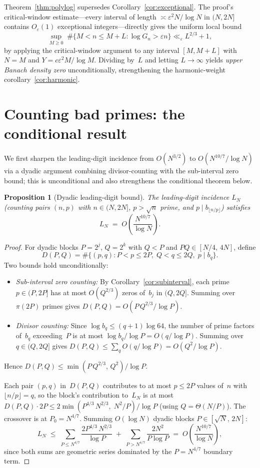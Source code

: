\documentclass[11pt]{article}
\newtheorem{proposition}[theorem]{Proposition}
\theoremstyle{definition}
\theoremstyle{remark}
\begin{document}
Theorem~\ref{thm:polylog} supersedes
Corollary~\ref{cor:exceptional}.
The proof's critical-window estimate---every interval
of length $\asymp \varepsilon^2 N/\log N$ in $(N, 2N]$
contains $O_\varepsilon(1)$ exceptional integers---directly
gives the uniform local bound
\[
\sup_{M \ge 0}\;\#\{M < n \le M + L :
\log G_n > \varepsilon n\}
\ll_\varepsilon L^{2/3} + 1,
\]
by applying the critical-window argument to any
interval $[M, M+L]$ with $N = M$ and
$Y = c\varepsilon^2 M/\log M$.
Dividing by~$L$ and letting $L \to \infty$ yields
\emph{upper Banach density zero} unconditionally,
strengthening the harmonic-weight
corollary~\ref{cor:harmonic}.

\section{Counting bad primes: the conditional result}

We first sharpen the leading-digit incidence
from $O(N^{3/2})$ to $O(N^{10/7}/\log N)$ via
a dyadic argument combining divisor-counting
with the sub-interval zero bound; this is
unconditional and also strengthens the
conditional theorem below.

\begin{proposition}[Dyadic leading-digit bound]\label{prop:lead}
The leading-digit incidence $L_N$
(counting pairs $(n, p)$ with $n \in (N, 2N]$,
$p > \sqrt{n}$ prime, and
$p \mid b_{\lfloor n/p \rfloor}$) satisfies
\[
L_N \;=\; O\!\left(\frac{N^{10/7}}{\log N}\right).
\]
\end{proposition}

\begin{proof}
For dyadic blocks $P = 2^j$, $Q = 2^k$ with
$Q < P$ and $PQ \in [N/4,\, 4N]$, define
\[
D(P,Q) = \#\{(p,q) : P < p \le 2P,\; Q < q \le 2Q,\;
p \mid b_q\}.
\]
Two bounds hold unconditionally:
\begin{itemize}
\item \emph{Sub-interval zero counting:}
By Corollary~\ref{cor:subinterval}, each prime
$p \in (P, 2P]$ has at most $O(Q^{2/3})$ zeros
of~$b_j$ in $(Q, 2Q]$.
Summing over $\pi(2P)$ primes gives
$D(P,Q) = O(P\,Q^{2/3}/\log P)$.
\item \emph{Divisor counting:}
Since $\log b_q \le (q{+}1)\log 64$,
the number of prime factors of~$b_q$
exceeding~$P$ is at most $\log b_q/\log P
= O(q/\log P)$.  Summing over
$q \in (Q, 2Q]$ gives
$D(P,Q) \le \sum_{q} O(q/\log P)
= O(Q^2/\log P)$.
\end{itemize}
Hence $D(P,Q) \le \min(P\,Q^{2/3},\, Q^2)/\log P$.

Each pair $(p,q)$ in~$D(P,Q)$ contributes to at
most $p \le 2P$ values of~$n$ with
$\lfloor n/p \rfloor = q$,
so the block's contribution to~$L_N$ is at most
$D(P,Q) \cdot 2P
\le 2\min(P^{4/3}\,N^{2/3},\; N^2/P)/\log P$
(using $Q = \Theta(N/P)$).
The crossover is at $P_0 = N^{4/7}$.
Summing $O(\log N)$ dyadic blocks
$P \in [\sqrt{N},\, 2N]$:
\[
L_N \;\le\;
\sum_{P \le N^{4/7}} \frac{2P^{4/3}\,N^{2/3}}{\log P}
\;+\;
\sum_{P > N^{4/7}} \frac{2N^2}{P\log P}
\;=\; O\!\left(\frac{N^{10/7}}{\log N}\right),
\]
since both sums are geometric series dominated by
the $P = N^{4/7}$ boundary term.
\end{proof}
\end{document}
